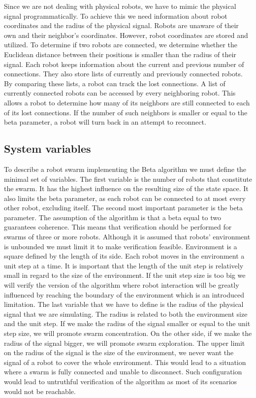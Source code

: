 Since we are not dealing with physical robots, we have to mimic the physical signal programmatically. To achieve this we need information about robot coordinates and the radius of the physical signal. Robots are unaware of their own and their neighbor's coordinates. However, robot coordinates are stored and utilized. To determine if two robots are connected, we determine whether the Euclidean distance between their positions is smaller than the radius of their signal. Each robot keeps information about the current and previous number of connections. They also store lists of currently and previously connected robots. By comparing these lists, a robot can track the lost connections. A list of currently connected robots can be accessed by every neighboring robot. This allows a robot to determine how many of its neighbors are still connected to each of its lost connections. If the number of such neighbors is smaller or equal to the beta parameter, a robot will turn back in an attempt to reconnect.


\subsection{System variables}
To describe a robot swarm implementing the Beta algorithm we must define the minimal set of variables. The first variable is the number of robots that constitute the swarm. It has the highest influence on the resulting size of the state space. It also limits the beta parameter, as each robot can be connected to at most every other robot, excluding itself. The second most important parameter is the beta parameter. The assumption of the algorithm is that a beta equal to two guarantees coherence. This means that verification should be performed for swarms of three or more robots. Although it is assumed that robots' environment is unbounded we must limit it to make verification feasible. Environment is a square defined by the length of its side. Each robot moves in the environment a unit step at a time. It is important that the length of the unit step is relatively small in regard to the size of the environment. If the unit step size is too big we will verify the version of the algorithm where robot interaction will be greatly influenced by reaching the boundary of the environment which is an introduced limitation. The last variable that we have to define is the radius of the physical signal that we are simulating. The radius is related to both the environment size and the unit step. If we make the radius of the signal smaller or equal to the unit step size, we will promote swarm concentration. On the other side, if we make the radius of the signal bigger, we will promote swarm exploration. The upper limit on the radius of the signal is the size of the environment, we never want the signal of a robot to cover the whole environment. This would lead to a situation where a swarm is fully connected and unable to disconnect. Such configuration would lead to untruthful verification of the algorithm as most of its scenarios would not be reachable.



